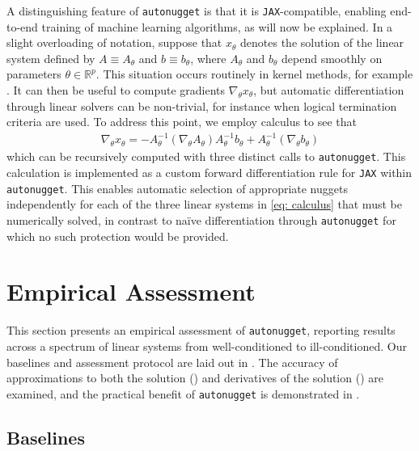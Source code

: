 \documentclass[10pt]{article} %
\begin{document}
A distinguishing feature of \texttt{autonugget} is that it is \texttt{JAX}-compatible, enabling end-to-end training of machine learning algorithms, as will now be explained.
In a slight overloading of notation, suppose that $x_\theta$ denotes the solution of the linear system defined by $A \equiv A_\theta$ and $b \equiv b_\theta$, where $A_\theta$ and $b_\theta$ depend smoothly on parameters $\theta \in \mathbb{R}^p$.
This situation occurs routinely in kernel methods, for example \citep{williams2006gaussian}.
It can then be useful to compute gradients $\nabla_\theta x_\theta$, but automatic differentiation through linear solvers can be non-trivial, for instance when logical termination criteria are used.
To address this point, we employ calculus to see that
\begin{align}
\nabla_\theta x_\theta = - A_\theta^{-1} (\nabla_\theta A_\theta) A_\theta^{-1} b_\theta + A_\theta^{-1} (\nabla_\theta b_\theta) \label{eq: calculus}
\end{align}
which can be recursively computed with three distinct calls to \texttt{autonugget}.
This calculation is implemented as a custom forward differentiation rule for \texttt{JAX} within \texttt{autonugget}.
This enables automatic selection of appropriate nuggets independently for each of the three linear systems in \eqref{eq: calculus} that must be numerically solved, in contrast to na\"{i}ve differentiation through \texttt{autonugget} for which no such protection would be provided.

\section{Empirical Assessment}
\label{sec: experiments}
This section presents an empirical assessment of \texttt{autonugget}, reporting results across a spectrum of linear systems from well-conditioned to ill-conditioned.
Our baselines and assessment protocol are laid out in .
The accuracy of approximations to both the solution () and derivatives of the solution () are examined, and the practical benefit of \texttt{autonugget} is demonstrated in .


\subsection{Baselines}
\label{sec: baselines}
\end{document}
